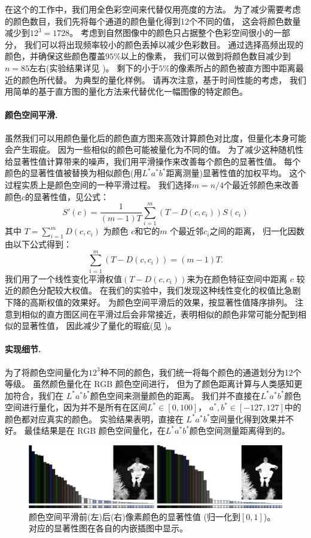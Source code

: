 \documentclass[final]{cvpr}
\newcommand{\Lab}{$L^*a^*b^*$}
\newcommand{\mypara}[1]{\paragraph{#1.}}
\begin{document}
在这个的工作中，我们用全色彩空间来代替仅用亮度的方法。
为了减少需要考虑的颜色数目，我们先将每个通道的颜色量化得到12个不同的值，
这会将颜色数量减少到$12^3=1728$。
考虑到自然图像中的颜色只占据整个色彩空间很小的一部分，
我们可以将出现频率较小的颜色丢掉以减少色彩数目。
通过选择高频出现的颜色，并确保这些颜色覆盖$95\%$以上的像素，
我们可以做到将颜色数目减少到$n=85$左右(实验结果详见 )。
剩下的小于$5\%$的像素所占的颜色被直方图中距离最近的颜色所代替。
为典型的量化样例。
请再次注意，基于时间性能的考虑，
我们用简单的基于直方图的量化方法来代替优化一幅图像的特定颜色。




\mypara{颜色空间平滑}
虽然我们可以用颜色量化后的颜色直方图来高效计算颜色对比度，但量化本身可能会产生瑕疵。
因为一些相似的颜色可能被量化为不同的值。
为了减少这种随机性给显著性值计算带来的噪声，我们用平滑操作来改善每个颜色的显著性值。
每个颜色的显著性值被替换为相似颜色(用\Lab 距离测量)显著性值的加权平均。
这个过程实质上是颜色空间的一种平滑过程。
我们选择$m=n/4$个最近邻颜色来改善颜色$c$的显著性值，见公式：
\begin{equation}\label{equ:smoothing}
    S'(c) = \frac{1}{(m-1)T} \sum_{i=1}^{m} (T-D(c, c_i))S(c_i)
\end{equation}
其中 $T=\sum_{i=1}^{m} D(c, c_i)$ 为颜色 $c$和它的$m$ 个最近邻$c_i$之间的距离，
归一化因数由以下公式得到：
\begin{equation*}\label{equ:smoothingN}
    \sum_{i=1}^{m} (T-D(c, c_i))=(m-1)T.
\end{equation*}
我们用了一个线性变化平滑权值$(T-D(c, c_i))$来为在颜色特征空间中距离
$c$ 较近的颜色分配较大权值。
在我们的实验中，我们发现这种线性变化的权值比急剧下降的高斯权值的效果好。
为颜色空间平滑后的效果，按显著性值降序排列。
注意到相似的直方图区间在平滑过后会非常接近，表明相似的颜色非常可能分配到相似的显著性值，
因此减少了量化的瑕疵(见 )。


\mypara{实现细节}
为了将颜色空间量化为$12^3$种不同的颜色，我们统一将每个颜色的通道划分为12个等级。
虽然颜色量化在 RGB 颜色空间进行，
但为了颜色距离计算与人类感知更加符合，我们在 \Lab 颜色空间来测量颜色的距离。
我们并不直接在\Lab 颜色空间进行量化，因为并不是所有在区间$L^*\in[0, 100]$，
$a^*, b^*\in[-127,127]$中的颜色都对应真实的颜色。
实验结果表明，直接在 \Lab 空间量化得到效果并不好。
最佳结果是在 RGB 颜色空间量化，在\Lab 颜色空间测量距离得到的。


\begin{figure}[t]
    \centering
    \includegraphics[width=\columnwidth]{histogram_saliency.pdf}
    \caption{颜色空间平滑前(左)后(右)像素颜色的显著性值
        (归一化到$[0, 1]$)。
        对应的显著性图在各自的内嵌插图中显示。
    }\label{fig:HCSmoothing}
\end{figure}
\end{document}

